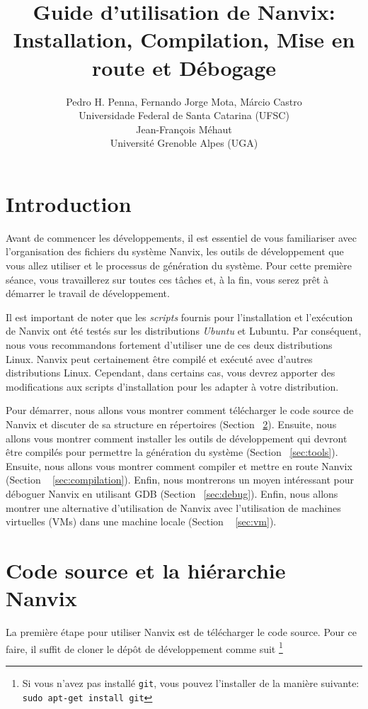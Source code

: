 \documentclass[11pt]{article}
\title{Guide d'utilisation de Nanvix: \\ Installation, Compilation, Mise en route et Débogage}
\author{Pedro H. Penna, Fernando Jorge Mota, Márcio Castro\\[0.2em]
  \small Universidade Federal de Santa Catarina (UFSC)\\[1.0em]
  Jean-François Méhaut\\[0.2em]
  \small Université Grenoble Alpes (UGA)\\
}
\date{}
\begin{document}
\maketitle

\section{Introduction}

Avant de commencer les développements, il est essentiel de
vous familiariser avec l'organisation des fichiers du système Nanvix,
les outils de développement que vous allez utiliser et le processus de
génération du système. Pour cette première séance, vous travaillerez sur
toutes ces tâches et, à la fin, vous serez prêt à démarrer le travail
de développement.

Il est important de noter que les \textit{scripts} fournis pour
l'installation et l'exécution de Nanvix ont été testés sur les
distributions \textit{Ubuntu} et Lubuntu. Par conséquent, nous vous
recommandons fortement d'utiliser une de ces deux distributions
Linux. Nanvix peut certainement être compilé et exécuté avec d'autres
distributions Linux. Cependant, dans certains cas, vous devrez
apporter des modifications aux scripts d'installation pour les
adapter à votre distribution.

Pour démarrer, nous allons vous montrer comment télécharger le code
source de Nanvix et discuter de sa structure en répertoires (Section
~\ref{sec:code}). Ensuite, nous allons vous montrer comment installer
les outils de développement qui devront être compilés pour permettre
la génération du système (Section ~\ref{sec:tools}). Ensuite, nous
allons vous montrer comment compiler et mettre en route Nanvix
(Section ~ \ref{sec:compilation}). Enfin, nous montrerons un moyen
intéressant pour déboguer Nanvix en utilisant GDB (Section ~\ref{sec:debug}).
Enfin, nous allons montrer une alternative d'utilisation
de Nanvix avec l'utilisation de machines virtuelles (VMs) dans une
machine locale (Section ~ \ref {sec:vm}).

\section{Code source et la hiérarchie Nanvix}
\label{sec:code}

La première étape pour utiliser Nanvix est de télécharger le code
source. Pour ce faire, il suffit de cloner le dépôt de développement
comme suit \footnote {Si vous n'avez pas installé \texttt{git}, vous
  pouvez l'installer de la manière suivante: \texttt {sudo apt-get install git}} \\
\end{document}
